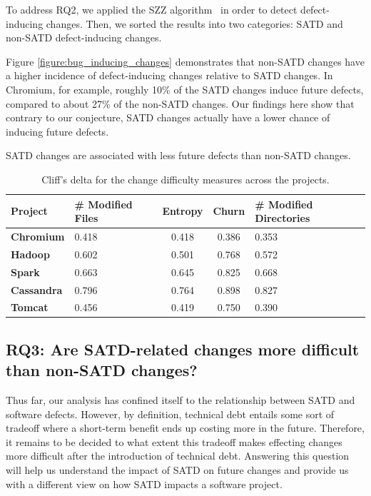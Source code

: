 To address RQ2, we applied the SZZ algorithm~\cite{sliwerski-msr-2005} in order to detect defect-inducing changes. Then, we sorted the results into two categories: SATD and non-SATD defect-inducing changes.




Figure \ref{figure:bug_inducing_changes} demonstrates that non-SATD changes have a higher incidence of defect-inducing changes relative to SATD changes.  In Chromium, for example, roughly 10\% of the SATD changes induce future defects, compared to about 27\% of the non-SATD changes. Our findings here show that contrary to our conjecture, SATD changes actually have a lower chance of inducing future defects.

\begin{myboxii}
	SATD changes are associated with less future defects than non-SATD changes.
\end{myboxii}




\begin{table}[tb!]
	\setlength{\tabcolsep}{.7\tabcolsep}
	\centering
	\caption{Cliff's delta for the change difficulty measures across the projects.}
	\begin{tabular}{l|C{1.5in}|c|c|C{2in}}
		\hline
		\textbf{Project}   & {\bf \# Modified Files}    & {\bf Entropy} & {\bf Churn} & {\bf\# Modified Directories}    \\ \hline
		\textbf{Chromium}  & 0.418 & 0.418   & 0.386 & 0.353 \\ \hline
		\textbf{Hadoop}    & 0.602 & 0.501   & 0.768 & 0.572 \\ \hline
		\textbf{Spark}     & 0.663 & 0.645   & 0.825 & 0.668 \\ \hline
		\textbf{Cassandra} & 0.796 & 0.764   & 0.898 & 0.827 \\ \hline
		\textbf{Tomcat}    & 0.456 & 0.419   & 0.750 & 0.390 \\ \hline
	\end{tabular}
	\label{table:cliff_deltas_RQ3}
\end{table}

\subsection*{RQ3: Are SATD-related changes more difficult than non-SATD changes?}

 Thus far, our analysis has confined itself to the relationship between SATD and software defects. However, by definition, technical debt entails some sort of tradeoff where a short-term benefit ends up costing more in the future. Therefore, it remains to be decided to what extent this tradeoff makes effecting changes more difficult after the introduction of technical debt. Answering this question will help us understand the impact of SATD on future changes and provide us with a different view on how SATD impacts a software project.


